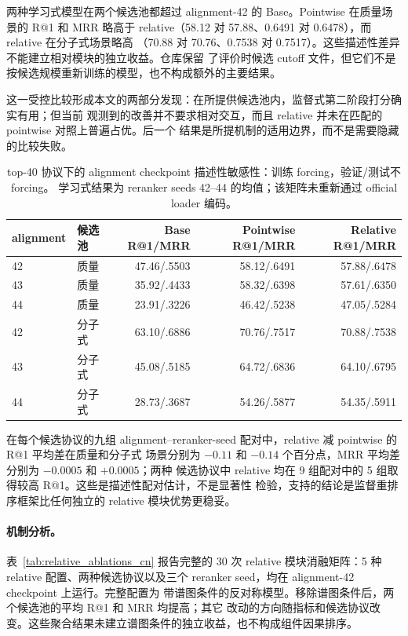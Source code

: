 \documentclass[UTF8,11pt]{ctexart}
\begin{document}
\noindent 两种学习式模型在两个候选池都超过 alignment-42 的 Base。Pointwise 在质量场景的 R@1
和 MRR 略高于 relative（58.12 对 57.88、0.6491 对 0.6478），而 relative 在分子式场景略高
（70.88 对 70.76、0.7538 对 0.7517）。这些描述性差异不能建立相对模块的独立收益。仓库保留
了评价时候选 cutoff 文件，但它们不是按候选规模重新训练的模型，也不构成额外的主要结果。

这一受控比较形成本文的两部分发现：在所提供候选池内，监督式第二阶段打分确实有用；但当前
观测到的改善并不要求相对交互，而且 relative 并未在匹配的 pointwise 对照上普遍占优。后一个
结果是所提机制的适用边界，而不是需要隐藏的比较失败。

\begin{table}[t]
  \centering
  \caption{top-40 协议下的 alignment checkpoint 描述性敏感性：训练 forcing，验证/测试不 forcing。
  学习式结果为 reranker seeds 42--44 的均值；该矩阵未重新通过 official loader 编码。}
  \label{tab:alignment_sensitivity_cn}
  \scriptsize
  \setlength{\tabcolsep}{2pt}
  \begin{tabular}{@{}llrrr@{}}
    \toprule
    alignment & 候选池 & Base R@1/MRR & Pointwise R@1/MRR & Relative R@1/MRR \\
    \midrule
    42 & 质量 & 47.46/.5503 & 58.12/.6491 & 57.88/.6478 \\
    43 & 质量 & 35.92/.4433 & 58.32/.6398 & 57.61/.6350 \\
    44 & 质量 & 23.91/.3226 & 46.42/.5238 & 47.05/.5284 \\
    \midrule
    42 & 分子式 & 63.10/.6886 & 70.76/.7517 & 70.88/.7538 \\
    43 & 分子式 & 45.08/.5185 & 64.72/.6836 & 64.10/.6795 \\
    44 & 分子式 & 28.73/.3687 & 54.26/.5877 & 54.35/.5911 \\
    \bottomrule
  \end{tabular}
\end{table}

在每个候选协议的九组 alignment--reranker-seed 配对中，relative 减 pointwise 的 R@1 平均差在质量和分子式
场景分别为 $-0.11$ 和 $-0.14$ 个百分点，MRR 平均差分别为 $-0.0005$ 和 $+0.0005$；两种
候选协议中 relative 均在 9 组配对中的 5 组取得较高 R@1。这些是描述性配对估计，不是显著性
检验，支持的结论是监督重排序框架比任何独立的 relative 模块优势更稳妥。

\paragraph{机制分析。}
表~\ref{tab:relative_ablations_cn} 报告完整的 30 次 relative 模块消融矩阵：5 种 relative
配置、两种候选协议以及三个 reranker seed，均在 alignment-42 checkpoint 上运行。完整配置为
带谱图条件的反对称模型。移除谱图条件后，两个候选池的平均 R@1 和 MRR 均提高；其它
改动的方向随指标和候选协议改变。这些聚合结果未建立谱图条件的独立收益，也不构成组件因果排序。
\end{document}
